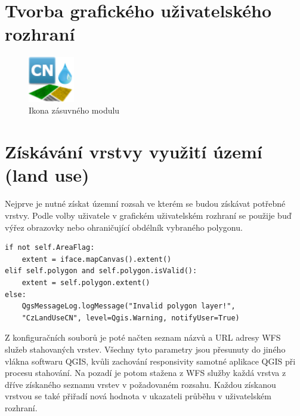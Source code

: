 \documentclass[a4paper,oneside,12pt]{book}
\begin{document}
\section{Tvorba grafického uživatelského rozhraní} \label{gui}
\begin{figure}[H] \label{obr12}
\centering
\includegraphics[height=2cm]{pictures/icon.png}
\caption{Ikona zásuvného modulu}
\label{fig:icon}
\end{figure}

\section{Získávání vrstvy využití území (land use)} \label{landuse}
\hspace{10mm}Nejprve je nutné získat územní rozsah ve kterém se budou získávat potřebné vrstvy. Podle volby uživatele v grafickém uživatelském rozhraní se použije buď výřez obrazovky nebo ohraničující obdélník vybraného polygonu.  
\begin{lstlisting}[style=mypython, caption={Získání územního rozsahu}, label={kod:extent}]
if not self.AreaFlag:
    extent = iface.mapCanvas().extent()
elif self.polygon and self.polygon.isValid():
    extent = self.polygon.extent()
else:
    QgsMessageLog.logMessage("Invalid polygon layer!", 
    "CzLandUseCN", level=Qgis.Warning, notifyUser=True)
\end{lstlisting}

\hspace{10mm}Z konfiguračních souborů je poté načten seznam názvů a URL adresy WFS služeb stahovaných vrstev. Všechny tyto parametry jsou přesunuty do jiného vlákna softwaru QGIS, kvůli zachování responsivity samotné aplikace QGIS při procesu stahování. Na pozadí je potom stažena z WFS služby každá vrstva z dříve získaného seznamu vrstev v požadovaném rozsahu. Každou získanou vrstvou se také přiřadí nová hodnota v ukazateli průběhu v uživatelském rozhraní.
\end{document}
